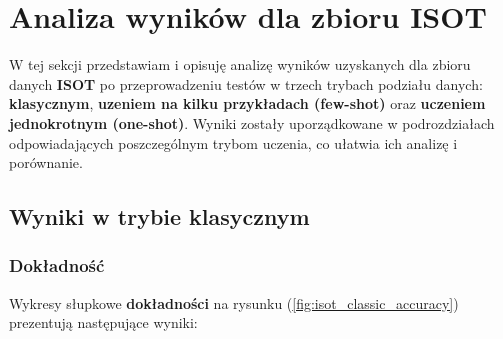 \section{Analiza wyników dla zbioru \textbf{ISOT}}
W tej sekcji przedstawiam i opisuję analizę wyników uzyskanych dla zbioru danych \textbf{ISOT} po przeprowadzeniu testów w trzech trybach podziału danych: \textbf{klasycznym}, \textbf{uzeniem na kilku przykładach (few-shot)} oraz \textbf{uczeniem jednokrotnym (one-shot)}. Wyniki zostały uporządkowane w podrozdziałach odpowiadających poszczególnym trybom uczenia, co ułatwia ich analizę i porównanie.

\subsection{Wyniki w trybie klasycznym}
\subsubsection{Dokładność}
Wykresy słupkowe \textbf{dokładności} na rysunku (\ref{fig:isot_classic_accuracy}) prezentują następujące wyniki:

